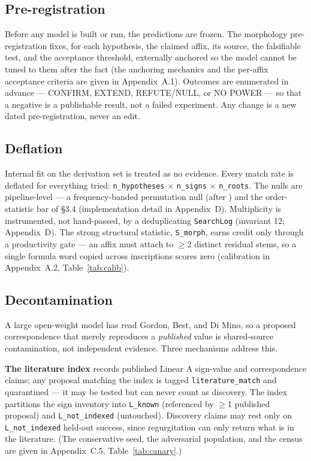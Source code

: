 \subsection{Pre-registration}

Before any model is built or run, the predictions are frozen. The
morphology pre-registration fixes, for each hypothesis, the claimed affix,
its source, the falsifiable test, and the acceptance threshold, externally
anchored so the model cannot be tuned to them after the fact (the anchoring
mechanics and the per-affix acceptance criteria are given in
Appendix~A.1). Outcomes are enumerated in advance --- CONFIRM, EXTEND,
REFUTE/NULL, or NO POWER --- so that a negative is a publishable result,
not a failed experiment. Any change is a new dated pre-registration,
never an edit.

\subsection{Deflation}

Internal fit on the derivation set is treated as no evidence. Every match
rate is deflated for everything tried: \texttt{n\_hypotheses} $\times$
\texttt{n\_signs} $\times$ \texttt{n\_roots}. The nulls are pipeline-level
--- a frequency-banded permutation null (after \citealp{packard1974}) and
the order-statistic bar of \S3.4 (implementation detail in Appendix~D).
Multiplicity is instrumented, not hand-passed, by a deduplicating
\texttt{SearchLog} (invariant 12; Appendix~D). The strong structural statistic,
\texttt{S\_morph}, earns credit only through a productivity gate --- an
affix must attach to $\ge$2 distinct residual stems, so a single formula
word copied across inscriptions scores zero (calibration in
Appendix~A.2, Table~\ref{tab:calib}).

\subsection{Decontamination}

A large open-weight model has read Gordon, Best, and Di Mino, so a
proposed correspondence that merely reproduces a \emph{published} value is
shared-source contamination, not independent evidence. Three mechanisms
address this.

\textbf{The literature index} records published Linear A sign-value and
correspondence claims; any proposal matching the index is tagged
\texttt{literature\_match} and quarantined --- it may be tested but can
never count as discovery. The index partitions the sign inventory into
\texttt{L\_known} (referenced by $\ge$1 published proposal) and
\texttt{L\_not\_indexed} (untouched). Discovery claims may rest only on
\texttt{L\_not\_indexed} held-out success, since regurgitation can only
return what is in the literature. (The conservative seed, the adversarial
population, and the census are given in Appendix~C.5,
Table~\ref{tab:canary}.)

